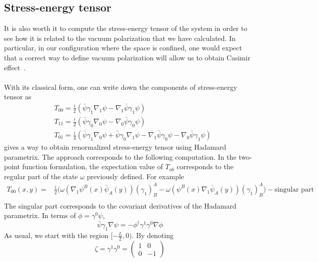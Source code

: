 \subsection{Stress-energy tensor}
It is also worth it to compute the stress-energy tensor of the system in order to see how it is related to the vacuum polarization that we have calculated.
In particular, in our configuration where the space is confined, one would expect that a correct way to define vacuum polarization will allow us to obtain Casimir effect~\cite{Casimir1948}.\\\\
%
With its classical form, one can write down the components of stress-energy tensor as
\begin{equation}
\begin{split}
& T_{00} = \frac{i}{2} (\bar{\psi} \gamma_1 \nabla_1 \psi - \nabla_1 \bar{\psi}\gamma_1 \psi)  \\
& T_{11} = \frac{i}{2} (\bar{\psi} \gamma_0 \nabla_0 \psi - \nabla_0 \bar{\psi}\gamma_0 \psi)  \\
& T_{01} = \frac{i}{4} (\bar{\psi} \gamma_1 \nabla_0 \psi +\bar{\psi} \gamma_0 \nabla_1 \psi - \nabla_1 \bar{\psi}\gamma_0 \psi - \nabla_0 \bar{\psi}\gamma_1 \psi)  
\end{split}
\end{equation}
\cite{Dappiaggi2009} gives a way to obtain renormalized stress-energy tensor using Hadamard parametrix.
The approach corresponds to the following computation.
In the two-point function formulation, the expectation value of $T_{ab}$ corresponds to the regular part of the state $\omega$ previously defined. For example
\begin{equation}
\begin{split}
T_{00}(x,y) = &
\frac{i}{2}\big(\omega( \nabla_1 \psi^B(x) \bar{\psi}_A(y))(\gamma_1)^A_B - \omega( \psi^B(x) \nabla_1 \bar{\psi}_A(y))(\gamma_1)^A_B \big) - \textrm{singular part}  \\
\end{split}
\end{equation}
The singular part corresponds to the covariant derivatives of the Hadamard parametrix.
In terms of $\phi = \gamma^0 \psi$, 
\begin{equation*}
\bar{\psi} \gamma_1 \nabla \psi = - \phi^\dagger \gamma^1 \gamma^0 \nabla \phi
\end{equation*}
As usual, we start with the region $[-\frac{L}{2}, 0)$. By denoting
\begin{equation*}
\zeta = \gamma^1 \gamma^0 = \begin{pmatrix}
1 & 0 \\
0 & -1
\end{pmatrix}
\end{equation*}
